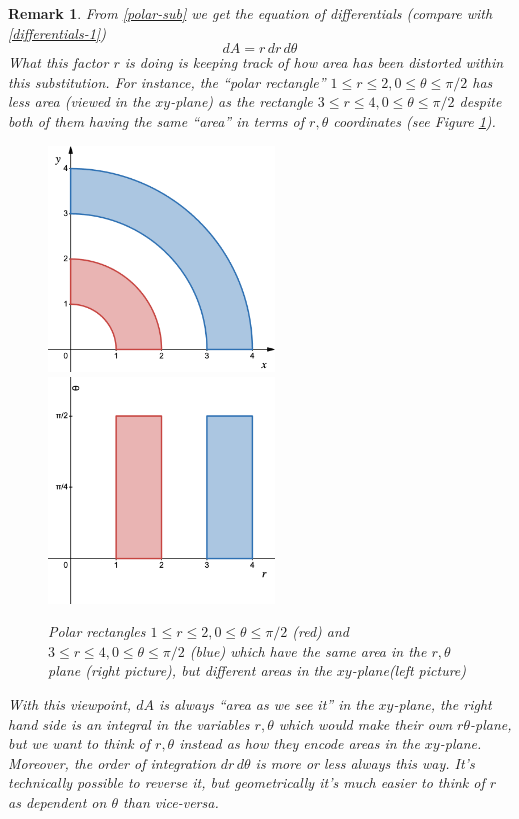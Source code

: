 \documentclass[12pt]{article}
\numberwithin{equation}{subsection}
\numberwithin{figure}{subsection}
\theoremstyle{note}
\newtheorem{remark}[subsection]{Remark}
\begin{document}
{\begin{remark}
	From \eqref{polar-sub} we get the equation of differentials (compare with \eqref{differentials-1}) \begin{equation} dA=r \,dr\,d\theta\end{equation} What this factor $r$ is doing is keeping track of how area has been distorted within this substitution. For instance, the ``polar rectangle'' $1\leq r\leq 2, 0\leq \theta\leq \pi/2$ has less area (viewed in the $xy$-plane) as the rectangle $3\leq r\leq 4, 0\leq \theta\leq \pi/2$ despite both of them having the same ``area'' in terms of $r,\theta$ coordinates (see Figure \ref{fig-polar-Jacob}). 
	
	\begin{figure}[h!]
	\centering
	\includegraphics[width=60mm]{Images/polar-regions-area} \qquad \qquad \includegraphics[width=60mm]{Images/rtheta-area}
	
	\caption{Polar rectangles $1\leq r\leq 2, 0\leq \theta \leq \pi/2$ (red) and $3\leq r\leq 4, 0\leq \theta \leq \pi/2$ (blue) which have the same area in the $r,\theta$ plane (right picture), but different areas in the $xy$-plane(left picture)}
	\label{fig-polar-Jacob}
	\end{figure}
	With this viewpoint, $dA$ is always ``area as we see it'' in the $xy$-plane, the right hand side is an integral in the variables $r,\theta$ which would make their own $r\theta$-plane, but we want to think of $r,\theta$ instead as how they encode areas in the $xy$-plane. Moreover, the order of integration $dr\,d\theta$ is more or less always this way. It's technically possible to reverse it, but geometrically it's much easier to think of $r$ as dependent on $\theta$ than vice-versa. 
	

\end{remark}}
\end{document}
